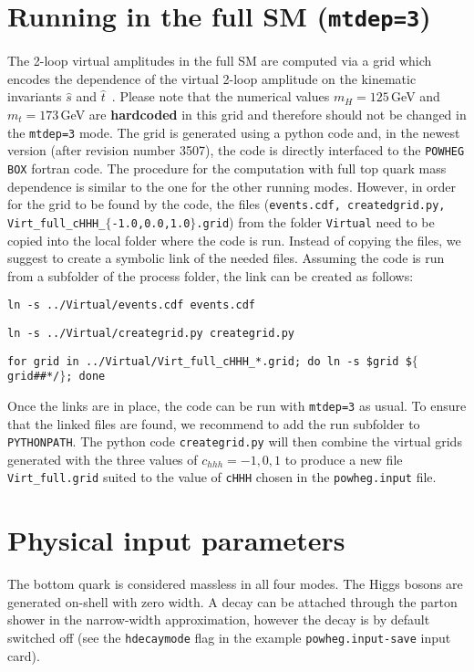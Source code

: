 \documentclass[paper]{JHEP3}
\newcommand\POWHEGBOX{{\tt POWHEG BOX}}
\begin{document}
\section{Running in the full SM ({\tt mtdep=3})}
The 2-loop virtual amplitudes in the full SM are computed via a grid
which encodes the dependence of the virtual 2-loop amplitude on the
kinematic invariants $\hat{s}$ and
$\hat{t}$~\cite{Heinrich:2017kxx}. Please note that the numerical
values $m_H=125$\,GeV and $m_t=173$\,GeV are {\bf hardcoded} in this
grid and therefore should not be changed in the {\tt mtdep=3} mode.
The grid is generated using a python code and, in the newest version
(after revision number 3507), the code is directly interfaced to the
\POWHEGBOX{} fortran code. The procedure for the computation with full
top quark mass dependence is similar to the one for the other running
modes. However, in order for the grid to be found by the code, the
files ({\tt events.cdf, createdgrid.py, Virt\_full\_cHHH\_$\lbrace$-1.0,0.0,1.0$\rbrace$.grid}) from the
folder {\tt Virtual} need to be copied into the local folder where the
code is run. Instead of copying the files, we suggest to create a
symbolic link of the needed files. Assuming the code is run from a
subfolder of the process folder, the link can be created as follows:
\begin{description}
\item{\tt ln -s ../Virtual/events.cdf events.cdf}
\item{\tt ln -s ../Virtual/creategrid.py creategrid.py}
\item{\tt for grid in ../Virtual/Virt\_full\_cHHH\_*.grid; do ln -s \$grid \$$\lbrace$grid\#\#*/$\rbrace$; done}
\end{description}
Once the links are in place, the code can be run with {\tt mtdep=3} as
usual. To ensure that the linked files are found, we recommend to add the run subfolder to {\tt PYTHONPATH}. The python code {\tt creategrid.py} will then combine the virtual grids generated with the three values of $c_{hhh} = -1,0,1$ to produce a new file {\tt Virt\_full.grid} suited to the value of {\tt cHHH} chosen in the {\tt powheg.input} file.

\section{Physical input parameters}

The bottom quark is considered massless in all four modes. The Higgs
bosons are generated on-shell with zero width. A decay can be attached
through the parton shower in the narrow-width approximation, however
the decay is by default switched off (see the {\tt hdecaymode} flag in the
example {\tt powheg.input-save} input card).
\end{document}
